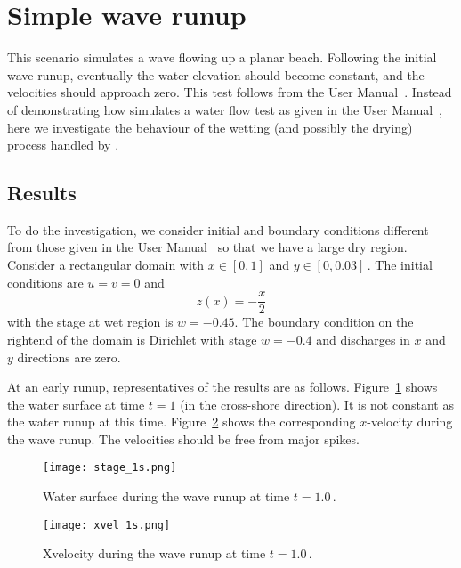 \section{Simple wave runup}
This scenario simulates a wave flowing up a planar beach. Following the initial wave runup, eventually the water elevation should become constant, and the velocities should approach zero. This test follows from the \anuga{} User Manual~\cite{RNGS2010}.
Instead of demonstrating how \anuga{} simulates a water flow test as given in the \anuga{} User Manual~\cite{RNGS2010}, here we investigate the behaviour of the wetting (and possibly the drying) process handled by \anuga{}.

\subsection{Results}
To do the investigation, we consider initial and boundary conditions different from those given in the \anuga{} User Manual~\cite{RNGS2010} so that we have a large dry region. Consider a rectangular domain with $x\in[0,1]$ and $y\in[0,0.03]$\,. The initial conditions are $u=v=0$ and 
\begin{equation}
z(x) = -\frac{x}{2}
\end{equation}
with the stage at wet region is $w=-0.45$. The boundary condition on the rightend of the domain is Dirichlet with stage $w=-0.4$ and discharges in $x$ and $y$ directions are zero.

At an early runup, representatives of the results are as follows. Figure~\ref{fig:stage_1s} shows the water surface at time $t=1$ (in the cross-shore direction). It is not constant as the water runup at this time. Figure~\ref{fig:xvel_1s} shows the corresponding $x$-velocity during the wave runup. The velocities should be free from major spikes.
\begin{figure}
\begin{center}
\texttt{[image: stage\_1s.png]}
\caption{Water surface during the wave runup at time $t=1.0$\,.}
\label{fig:stage_1s}
\end{center}
\end{figure}

\begin{figure}
\begin{center}
\texttt{[image: xvel\_1s.png]}
\caption{Xvelocity during the wave runup at time $t=1.0$\,.}
\label{fig:xvel_1s}
\end{center}
\end{figure}



